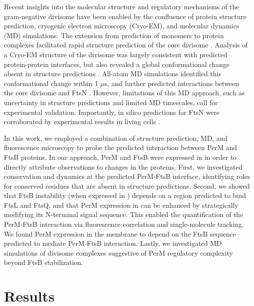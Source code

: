 \documentclass[pdflatex,sn-basic]{sn-jnl}%
\begin{document}
Recent insights into the molecular structure and regulatory mechanisms of the gram-negative divisome have been enabled by the confluence of protein structure prediction, cryogenic electron microscopy (Cryo-EM), and molecular dynamics (MD) simulations. The extension from prediction of monomers to protein complexes \citep{baekAccuratePredictionProtein2021, evansProteinComplexPrediction2022} facilitated rapid structure prediction of the core \ec{} divisome \citep{attaibiUpdatedModelDivisome2022, cravenModelInteractionsFtsQLB2022}. Analysis of a Cryo-EM structure of the \pafull{} divisome was largely consistent with predicted protein-protein interfaces, but also revealed a global conformational change absent in structure predictions \citep{kashammerCryoEMStructureBacterial2023}. All-atom MD simulations identified this conformational change within 1 $\mu$s, and further predicted interactions between the core divisome and \ec{} FtsN \citep{brittonConformationalChangesEssential2023}. However, limitations of this MD approach, such as uncertainty in structure predictions and limited MD timescales, call for experimental validation. Importantly, in silico predictions for FtsN were corroborated by experimental results in living cells \citep{parkEssentialDomainFtsN2023}.

In this work, we employed a combination of structure prediction, MD, and fluorescence microscopy to probe the predicted interaction between \mtb{} PerM and FtsB proteins. In our approach, \mtb{} PerM and FtsB were expressed in \ec{} in order to directly attribute observations to changes in the \mtb{} proteins. First, we investigated conservation and dynamics at the predicted PerM-FtsB interface, identifying roles for conserved residues that are absent in structure predictions. Second, we showed that FtsB instability (when expressed in \ec{}) depends on a region predicted to bind FtsL and FtsQ, and that PerM expression in \ec{} can be enhanced by strategically modifying its N-terminal signal sequence. This enabled the quantification of the PerM-FtsB interaction via fluorescence correlation and single-molecule tracking. We found PerM expression in the \ec{} membrane to depend on the FtsB sequence predicted to mediate PerM-FtsB interaction. Lastly, we investigated MD simulations of \mtb{} divisome complexes suggestive of PerM regulatory complexity beyond FtsB stabilization.

\section{Results}
\end{document}

